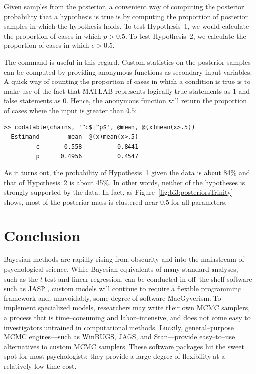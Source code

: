 Given samples from the posterior, a convenient way of computing the posterior probability that a hypothesis is true is by computing the proportion of posterior samples in which the hypothesis holds. To test Hypothesis~1, we would calculate the proportion of cases in which $p > 0.5$. To test Hypothesis~2, we calculate the proportion of cases in which $c > 0.5$.

The  command is useful in this regard. Custom statistics on the posterior samples can be computed by providing anonymous functions as secondary input variables. A quick way of counting the proportion of cases in which a condition is true is to make use of the fact that MATLAB represents logically true statements as $1$ and false statements as $0$. Hence, the anonymous function  will return the proportion of cases where the input is greater than $0.5$:

\begin{lstlisting}
>> codatable(chains, '^c$|^p$', @mean, @(x)mean(x>.5))
  Estimand        mean  @(x)mean(x>.5)
         c       0.558          0.8441
         p      0.4956          0.4547
\end{lstlisting}
As it turns out, the probability of Hypothesis~1 given the data is about 84\% and that of Hypothesis~2 is about 45\%. In other words, neither of the hypotheses is strongly supported by the data. In fact, as Figure~\ref{fig:bi3:posteriorsTrinity} shows, most of the posterior mass is clustered near $0.5$ for all parameters.

\section{Conclusion}

{Bayesian methods are rapidly rising from obscurity and into the mainstream of psychological science. While {Bayesian equivalents of} many standard analyses, such as the $t$ test and linear regression, can be conducted in off--the-shelf software such as JASP \cite{jasp}, custom models will continue to require a flexible programming framework and, unavoidably, some degree of software MacGyverism. To implement specialized models, researchers may write their own MCMC samplers, a process that is time--consuming and labor--intensive, and does not come easy to investigators untrained in computational methods. Luckily, general--purpose MCMC engines---such as WinBUGS, JAGS, and Stan---provide easy--to--use alternatives to custom MCMC samplers. These software packages hit the sweet spot for most psychologists; they provide a large degree of flexibility at a relatively low {time} cost.} 

